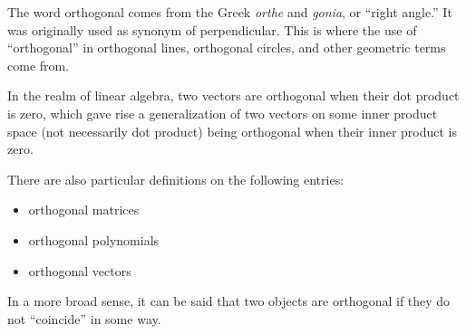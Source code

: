 \documentclass[12pt]{article}
\begin{document}
The word orthogonal comes from the Greek \emph{orthe} and \emph{gonia}, or ``right angle.''  It was originally used as synonym of perpendicular. This is where the use of ``orthogonal'' in  orthogonal lines, orthogonal circles, and other geometric terms come from.

In the realm of linear algebra, two vectors are orthogonal when their dot product is zero, which gave rise a generalization of two vectors on some inner product space (not necessarily dot product) being orthogonal when their inner product is zero. 

There are also particular definitions on the following entries:
\begin{itemize}
 \item orthogonal matrices
 \item orthogonal polynomials
 \item orthogonal vectors
\end{itemize}

In a more broad sense, it can be said that two objects are orthogonal if they do not ``coincide'' in some way.
\end{document}
